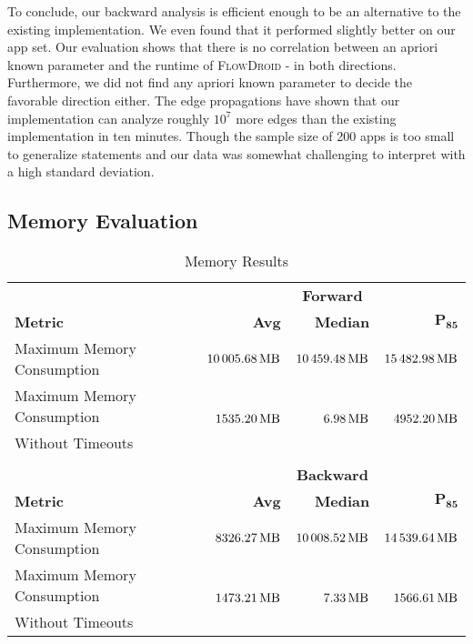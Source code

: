\documentclass[../draft.tex]{subfiles}
\begin{document}
    To conclude, our backward analysis is efficient enough to be an alternative to the existing implementation.
    We even found that it performed slightly better on our app set.
    Our evaluation shows that there is no correlation between an apriori known parameter and the runtime of \textsc{FlowDroid} - in both directions.
    Furthermore, we did not find any apriori known parameter to decide the favorable direction either.
    The edge propagations have shown that our implementation can analyze roughly $10^7$ more edges than the existing implementation in ten minutes. 
    Though the sample size of 200 apps is too small to generalize statements and our data was somewhat challenging to interpret with a high standard deviation.

    \FloatBarrier
    \subsection{Memory Evaluation}\label{s:memex}

    \begin{table}[tbp]
        \centering
        \begin{tabular}{l | r | r | r}
            & \multicolumn{3}{c}{\textbf{Forward}}\\
            \textbf{Metric} & \textbf{Avg} & \textbf{Median} & $\mathbf{P_{85}}$\\
            \hline\hline
            Maximum Memory Consumption & $\SI{10005.68}{\mega\byte}$ & $\SI{10459.48}{\mega\byte}$ & $\SI{15482.98}{\mega\byte}$\\
            \hline
            Maximum Memory Consumption & \multirow{2}{*}{$\SI{1535.20}{\mega\byte}$} & \multirow{2}{*}{$\SI{6.98}{\mega\byte}$} & \multirow{2}{*}{$\SI{4952.20}{\mega\byte}$}\\
            Without Timeouts & & &\\            
            \multicolumn{4}{c}{}\\
            & \multicolumn{3}{c}{\textbf{Backward}}\\
            \textbf{Metric} & \textbf{Avg} & \textbf{Median} & $\mathbf{P_{85}}$\\
            \hline\hline
            Maximum Memory Consumption & $\SI{8326.27}{\mega\byte}$ & $\SI{10008.52}{\mega\byte}$ & $\SI{14539.64}{\mega\byte}$\\
            \hline
            Maximum Memory Consumption & \multirow{2}{*}{$\SI{1473.21}{\mega\byte}$} & \multirow{2}{*}{$\SI{7.33}{\mega\byte}$} & \multirow{2}{*}{$\SI{1566.61}{\mega\byte}$}\\
            Without Timeouts & & &\\
        \end{tabular}
        \caption{Memory Results}
        \label{t:memres}
    \end{table}
\end{document}
